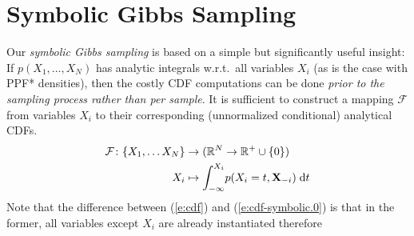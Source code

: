 \documentclass[]{article}
\newcommand{\bvec}[1]{\textbf{#1}}
\newcommand{\pr}{p}
\newcommand{\dd}{\;\mathrm{d}} %
\begin{document}
\section{Symbolic Gibbs Sampling}
\label{sect:symbolic.gibbs}

%
Our \emph{symbolic Gibbs sampling} is based on a simple but significantly useful insight:
If $\pr(X_1, \ldots, X_N)$
has analytic integrals w.r.t.\ all variables $X_i$ (as is the case with PPF* densities),
then the costly CDF computations can be done \emph{prior to the sampling process rather than per sample}. 
It is sufficient to construct a mapping $\mathcal{F}$ from variables $X_i$ to their corresponding (unnormalized conditional) analytical CDFs. 
\begin{align} \footnotesize
 \mathcal{F}\colon \{X_1, \ldots X_N\} &\to (\mathbb{R}^N \to \mathbb{R}^{+} \cup \{0\}) \notag\\
 X_i &\mapsto \int_{-\infty}^{X_i} \! \pr(X_i = t , \bvec{X}_{-i}) \dd  t 
\label{e:cdf-symbolic.0}	
\end{align}
Note that the difference between (\ref{e:cdf}) and (\ref{e:cdf-symbolic.0}) is that in the former, 
all variables except $X_i$ are already instantiated therefore 
\end{document}
